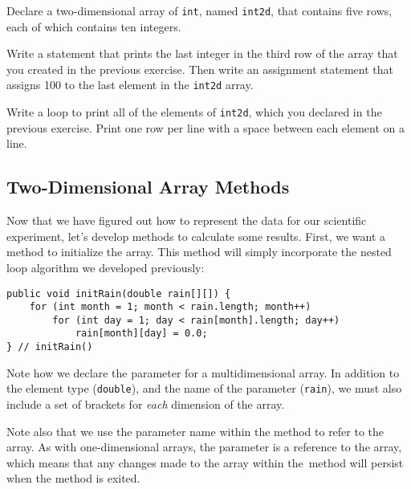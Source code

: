 \label{self-study-exercises}
\begin{SSTUDY}

\item  Declare a two-dimensional array of {\tt int}, named {\tt int2d},
that contains five rows,  each of which  contains ten integers.


\item  Write a statement that prints the last integer in the third row of the
array that you created in the previous exercise.  Then write an assignment
statement that assigns 100 to the last element in the {\tt int2d}
array.

\item Write a loop to print all of the elements of {\tt int2d}, which
you declared in the previous exercise.  Print one row per line with a
space between each element on a line.

\end{SSTUDY}

\subsection{Two-Dimensional Array Methods}
\noindent Now that we have figured out how to represent the data for our
scientific experiment, let's develop methods to calculate some
results.   First, we want a method to initialize the array.  This method
will simply incorporate the nested loop algorithm we developed previously:

\begin{jjjlisting}
\begin{lstlisting}
public void initRain(double rain[][]) {
    for (int month = 1; month < rain.length; month++)
        for (int day = 1; day < rain[month].length; day++)
            rain[month][day] = 0.0;
} // initRain()
\end{lstlisting}
\end{jjjlisting}

\noindent Note how we declare the parameter for a multidimensional
array.  In addition to the element type ({\tt double}), and the name of
the parameter ({\tt rain}), we must also include a set of brackets
for {\it each} dimension of the array.

Note also that we use the parameter name within the method to refer
to the array.  As with one-dimensional arrays, the parameter is a
reference to the array, which means that any changes made to the array
within the~method will persist when the method is exited.


